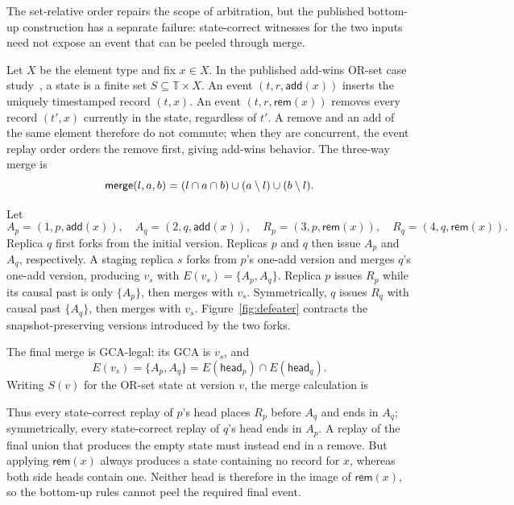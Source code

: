 The set-relative order repairs the scope of arbitration, but the published
bottom-up construction has a separate failure: state-correct witnesses for the
two inputs need not expose an event that can be peeled through merge.

\begin{example}
\label{ex:defeater}
Let $X$ be the element type and fix $x\in X$. In the published add-wins OR-set case
study~\cite{soundarapandian2025automatic}, a state is a finite set
$S\subseteq\mathbb T\times X$. An event $(t,r,\mathsf{add}(x))$ inserts the
uniquely timestamped record $(t,x)$. An event
$(t,r,\mathsf{rem}(x))$ removes every record $(t',x)$ currently in the state,
regardless of $t'$. A remove and an add of the same element therefore do not
commute; when they are concurrent, the event replay order orders the remove first,
giving add-wins behavior. The three-way merge is
\[
 \merge(l,a,b)=(l\cap a\cap b)\cup(a\setminus l)\cup(b\setminus l).
\]

Let
\[
 A_p=(1,p,\mathsf{add}(x)),\quad A_q=(2,q,\mathsf{add}(x)),\quad
 R_p=(3,p,\mathsf{rem}(x)),\quad R_q=(4,q,\mathsf{rem}(x)).
\]
Replica $q$ first forks from the initial version. Replicas $p$ and $q$ then
issue $A_p$ and $A_q$, respectively. A staging replica $s$ forks from $p$'s
one-add version and merges $q$'s one-add version, producing $v_s$ with
$E(v_s)=\{A_p,A_q\}$. Replica $p$ issues $R_p$ while its causal past is only
$\{A_p\}$, then merges with $v_s$. Symmetrically, $q$ issues $R_q$ with causal
past $\{A_q\}$, then merges with $v_s$. Figure~\ref{fig:defeater} contracts the
snapshot-preserving versions introduced by the two forks.

The final merge is GCA-legal: its GCA is $v_s$, and
\[
 E(v_s)=\{A_p,A_q\}
       =E(\mathsf{head}_p)\cap E(\mathsf{head}_q).
\]
Writing $S(v)$ for the OR-set state at version $v$, the merge calculation is
\begin{center}
\end{center}
Thus every state-correct replay of $p$'s head places $R_p$ before $A_q$ and
ends in $A_q$; symmetrically, every state-correct replay of $q$'s head ends in
$A_p$. A replay of the final union that produces the empty state must instead
end in a remove.
But applying $\mathsf{rem}(x)$ always produces a state containing no record for
$x$, whereas both side heads contain one. Neither head is therefore in the
image of $\mathsf{rem}(x)$, so the bottom-up rules cannot peel the required
final event.


\end{example}
